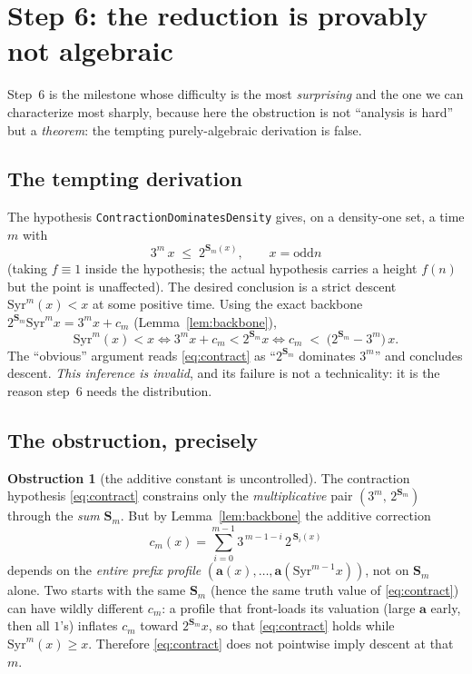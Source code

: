 \documentclass[11pt]{article}
\theoremstyle{plain}
\theoremstyle{definition}
\newtheorem{obstruction}[thm]{Obstruction}
\theoremstyle{remark}
\newcommand{\Syr}{\mathrm{Syr}}
\newcommand{\aval}{\mathbf{a}}
\newcommand{\Ssum}{\mathbf{S}}
\newcommand{\odd}{\mathrm{odd}}
\newcommand{\code}[1]{\texttt{\small #1}}
\begin{document}
\section{Step 6: the reduction is provably not algebraic}
\label{sec:step6}

Step~6 is the milestone whose difficulty is the most \emph{surprising} and the
one we can characterize most sharply, because here the obstruction is not
``analysis is hard'' but a \emph{theorem}: the tempting purely-algebraic
derivation is false.

\subsection{The tempting derivation}

The hypothesis \code{ContractionDominatesDensity} gives, on a density-one set, a
time $m$ with
\begin{equation}\label{eq:contract}
  3^m\,x \;\le\; 2^{\Ssum_m(x)},\qquad x=\odd n
\end{equation}
(taking $f\equiv 1$ inside the hypothesis; the actual hypothesis carries a
height $f(n)$ but the point is unaffected). The desired conclusion is a strict
descent $\Syr^m(x)<x$ at some positive time. Using the exact backbone
$2^{\Ssum_m}\Syr^m x = 3^m x + c_m$ (Lemma~\ref{lem:backbone}),
\[
  \Syr^m(x) < x
  \iff 3^m x + c_m < 2^{\Ssum_m}x
  \iff c_m \;<\; \bigl(2^{\Ssum_m}-3^m\bigr)\,x .
\]
The ``obvious'' argument reads \eqref{eq:contract} as ``$2^{\Ssum_m}$ dominates
$3^m$'' and concludes descent. \emph{This inference is invalid}, and its failure
is not a technicality: it is the reason step~6 needs the distribution.

\subsection{The obstruction, precisely}

\begin{obstruction}[the additive constant is uncontrolled]\label{obs:additive}
The contraction hypothesis \eqref{eq:contract} constrains only the
\emph{multiplicative} pair $(3^m,\,2^{\Ssum_m})$ through the \emph{sum}
$\Ssum_m$. But by Lemma~\ref{lem:backbone} the additive correction
\[
  c_m(x)=\sum_{i=0}^{m-1} 3^{\,m-1-i}\,2^{\,\Ssum_i(x)}
\]
depends on the \emph{entire prefix profile} $(\aval(x),\dots,\aval(\Syr^{m-1}x))$,
not on $\Ssum_m$ alone. Two starts with the same $\Ssum_m$ (hence the same
truth value of \eqref{eq:contract}) can have wildly different $c_m$: a profile
that front-loads its valuation (large $\aval$ early, then all $1$'s) inflates
$c_m$ toward $2^{\Ssum_m}x$, so that \eqref{eq:contract} holds while
$\Syr^m(x)\ge x$. Therefore \eqref{eq:contract} does not pointwise imply descent
at that $m$.
\end{obstruction}
\end{document}
